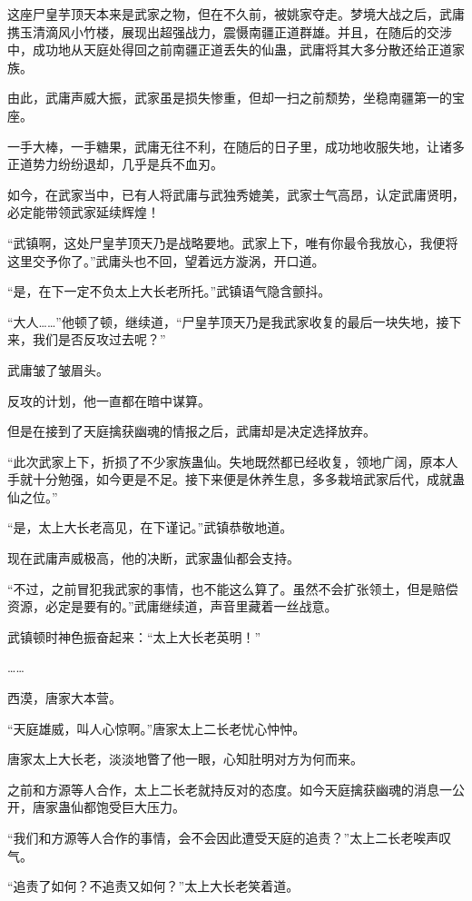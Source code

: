 \begin{this_body}
这座尸皇芋顶天本来是武家之物，但在不久前，被姚家夺走。梦境大战之后，武庸携玉清滴风小竹楼，展现出超强战力，震慑南疆正道群雄。并且，在随后的交涉中，成功地从天庭处得回之前南疆正道丢失的仙蛊，武庸将其大多分散还给正道家族。

由此，武庸声威大振，武家虽是损失惨重，但却一扫之前颓势，坐稳南疆第一的宝座。

一手大棒，一手糖果，武庸无往不利，在随后的日子里，成功地收服失地，让诸多正道势力纷纷退却，几乎是兵不血刃。

如今，在武家当中，已有人将武庸与武独秀媲美，武家士气高昂，认定武庸贤明，必定能带领武家延续辉煌！

“武镇啊，这处尸皇芋顶天乃是战略要地。武家上下，唯有你最令我放心，我便将这里交予你了。”武庸头也不回，望着远方漩涡，开口道。

“是，在下一定不负太上大长老所托。”武镇语气隐含颤抖。

“大人……”他顿了顿，继续道，“尸皇芋顶天乃是我武家收复的最后一块失地，接下来，我们是否反攻过去呢？”

武庸皱了皱眉头。

反攻的计划，他一直都在暗中谋算。

但是在接到了天庭擒获幽魂的情报之后，武庸却是决定选择放弃。

“此次武家上下，折损了不少家族蛊仙。失地既然都已经收复，领地广阔，原本人手就十分勉强，如今更是不足。接下来便是休养生息，多多栽培武家后代，成就蛊仙之位。”

“是，太上大长老高见，在下谨记。”武镇恭敬地道。

现在武庸声威极高，他的决断，武家蛊仙都会支持。

“不过，之前冒犯我武家的事情，也不能这么算了。虽然不会扩张领土，但是赔偿资源，必定是要有的。”武庸继续道，声音里藏着一丝战意。

武镇顿时神色振奋起来：“太上大长老英明！”

……

西漠，唐家大本营。

“天庭雄威，叫人心惊啊。”唐家太上二长老忧心忡忡。

唐家太上大长老，淡淡地瞥了他一眼，心知肚明对方为何而来。

之前和方源等人合作，太上二长老就持反对的态度。如今天庭擒获幽魂的消息一公开，唐家蛊仙都饱受巨大压力。

“我们和方源等人合作的事情，会不会因此遭受天庭的追责？”太上二长老唉声叹气。

“追责了如何？不追责又如何？”太上大长老笑着道。


\end{this_body}
